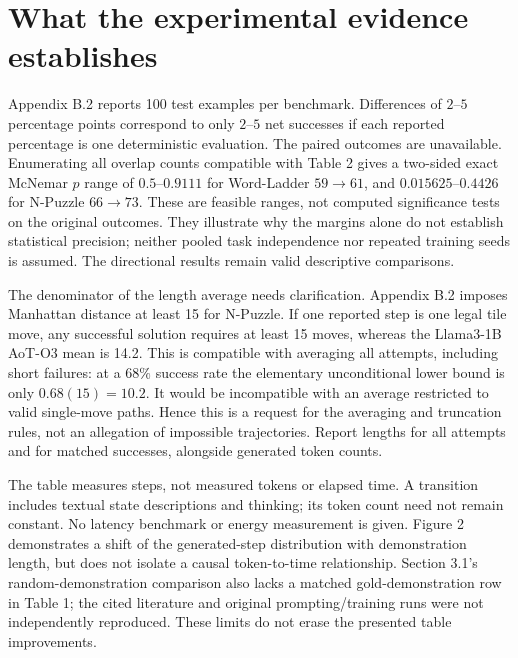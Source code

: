 \documentclass[10pt]{article}
\begin{document}
\section*{What the experimental evidence establishes}
Appendix B.2 reports 100 test examples per benchmark. Differences of \(2\)–\(5\) percentage points correspond to only \(2\)–\(5\) net successes if each reported percentage is one deterministic evaluation. The paired outcomes are unavailable. Enumerating all overlap counts compatible with Table 2 gives a two-sided exact McNemar \(p\) range of \(0.5\)–\(0.9111\) for Word-Ladder \(59\to61\), and \(0.015625\)–\(0.4426\) for N-Puzzle \(66\to73\). These are feasible ranges, not computed significance tests on the original outcomes. They illustrate why the margins alone do not establish statistical precision; neither pooled task independence nor repeated training seeds is assumed. The directional results remain valid descriptive comparisons.\par
The denominator of the length average needs clarification. Appendix B.2 imposes Manhattan distance at least 15 for N-Puzzle. If one reported step is one legal tile move, any successful solution requires at least 15 moves, whereas the Llama3-1B AoT-O3 mean is 14.2. This is compatible with averaging all attempts, including short failures: at a \(68\%\) success rate the elementary unconditional lower bound is only \(0.68(15)=10.2\). It would be incompatible with an average restricted to valid single-move paths. Hence this is a request for the averaging and truncation rules, not an allegation of impossible trajectories. Report lengths for all attempts and for matched successes, alongside generated token counts.\par
The table measures steps, not measured tokens or elapsed time. A transition includes textual state descriptions and thinking; its token count need not remain constant. No latency benchmark or energy measurement is given. Figure 2 demonstrates a shift of the generated-step distribution with demonstration length, but does not isolate a causal token-to-time relationship. Section 3.1’s random-demonstration comparison also lacks a matched gold-demonstration row in Table 1; the cited literature and original prompting/training runs were not independently reproduced. These limits do not erase the presented table improvements.\par
\end{document}
